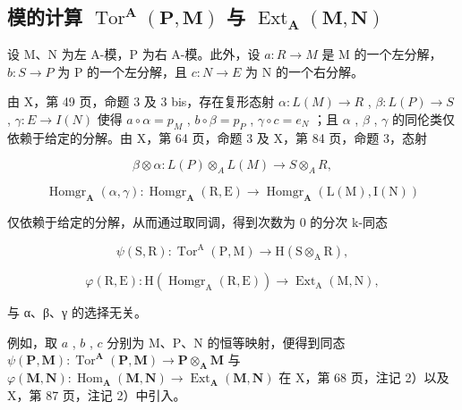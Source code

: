 \subsection{\texorpdfstring{模的计算 \(\operatorname{Tor}^{\mathbf{A}}(\mathbf{P},\mathbf{M})\) 与 \(\operatorname{Ext}_{\mathbf{A}}(\mathbf{M},\mathbf{N})\)}{模的计算 \textbackslash operatorname\{Tor\}\^{}\{\textbackslash mathbf\{A\}\}(\textbackslash mathbf\{P\},\textbackslash mathbf\{M\}) 与 \textbackslash operatorname\{Ext\}\_\{\textbackslash mathbf\{A\}\}(\textbackslash mathbf\{M\},\textbackslash mathbf\{N\})}}

设 M、N 为左 A-模，P 为右 A-模。此外，设 \(a: R \rightarrow M\) 是 M 的一个左分解， \(b: S \rightarrow P\) 为 P 的一个左分解，且 \(c: N \rightarrow E\) 为 N 的一个右分解。

由 X，第 49 页，命题 3 及 3 bis，存在复形态射 \(\alpha: L(M) \to R\) , \(\beta: L(P) \to S\) , \(\gamma: E \to I(N)\) 使得 \(a \circ \alpha = p_{M}\) , \(b \circ \beta = p_{P}\) , \(\gamma \circ c = e_{N}\) ；且 \(\alpha\) , \(\beta\) , \(\gamma\) 的同伦类仅依赖于给定的分解。由 X，第 64 页，命题 3 及 X，第 84 页，命题 3，态射

\[
\beta \otimes \alpha : L (P) \otimes_ {A} L (M) \rightarrow S \otimes_ {A} R,
\]

\[
\operatorname{Homgr} _ {\mathbf {A}} (\alpha , \gamma): \operatorname{Homgr} _ {\mathbf {A}} (\mathrm{R}, \mathrm{E}) \rightarrow \operatorname{Homgr} _ {\mathbf {A}} (\mathrm{L} (\mathrm{M}), \mathrm{I} (\mathrm{N}))
\]

仅依赖于给定的分解，从而通过取同调，得到次数为 0 的分次 k-同态

\[
\psi (\mathrm{S}, \mathrm{R}): \operatorname{Tor} ^ {\mathrm{A}} (\mathrm{P}, \mathrm{M}) \rightarrow \mathrm{H} (\mathrm{S} \otimes_ {\mathrm{A}} \mathrm{R}),
\]

\[
\varphi (\mathrm{R}, \mathrm{E}): \mathrm{H} \left(\operatorname{Homgr} _ {\mathrm{A}} (\mathrm{R}, \mathrm{E})\right)\rightarrow \operatorname{Ext} _ {\mathrm{A}} (\mathrm{M}, \mathrm{N}),
\]

与 α、β、γ 的选择无关。

例如，取 \(a\) , \(b\) , \(c\) 分别为 M、P、N 的恒等映射，便得到同态 \(\psi(\mathbf{P}, \mathbf{M}) : \operatorname{Tor}^{\mathbf{A}}(\mathbf{P}, \mathbf{M}) \to \mathbf{P} \otimes_{\mathbf{A}} \mathbf{M}\) 与 \(\varphi(\mathbf{M}, \mathbf{N}) : \operatorname{Hom}_{\mathbf{A}}(\mathbf{M}, \mathbf{N}) \to \operatorname{Ext}_{\mathbf{A}}(\mathbf{M}, \mathbf{N})\) 在 X，第 68 页，注记 2）以及 X，第 87 页，注记 2）中引入。

